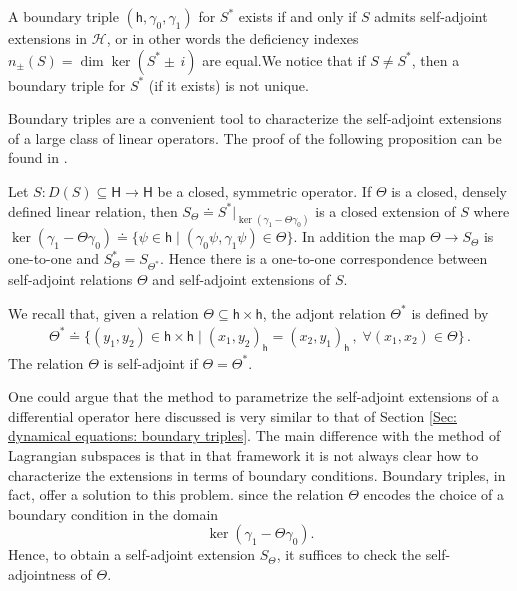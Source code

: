 \begin{remark}\label{Rmk: boundary triple}
	A boundary triple $(\mathsf{h},\gamma_0,\gamma_1)$ for $S^*$ exists if and only if $S$ admits self-adjoint extensions in $\mathcal{H}$, or in other words the deficiency indexes $n_\pm(S) = \dim \ker (S^* \pm\, i)$ are equal.We notice that if $S\neq S^*$, then a boundary triple for $S^*$ (if it exists) is not unique.
\end{remark}

Boundary triples are a convenient tool to characterize the self-adjoint extensions of a large class of linear operators. The proof of the following proposition can be found in \cite{Malamud}.

\begin{proposition}\label{Prop: Self-Adjoint Extensions}
	Let $S:D(S)\subseteq\mathsf{H}\to\mathsf{H}$ be a closed, symmetric operator.
	If $\Theta$ is a closed, densely defined linear relation, then $S_\Theta\doteq S^*|_{\ker(\gamma_1-\Theta\gamma_0)}$ is a closed extension of $S$
	where $\ker(\gamma_1-\Theta\gamma_0)\doteq\{\psi\in\mathsf{h}\;|\;(\gamma_0\psi,\gamma_1\psi)\in\Theta\}$.
	In addition the map $\Theta\to S_\Theta$ is one-to-one and $S^*_\Theta=S_{\Theta^*}$.
	Hence there is a one-to-one correspondence between self-adjoint relations $\Theta$ and self-adjoint extensions of $S$.
\end{proposition}

\begin{remark}\label{Rmk: relations}
	We recall that, given a relation $\Theta\subseteq\mathsf{h}\times\mathsf{h}$, the adjont relation $\Theta^*$ is defined by
	\begin{align}\label{Eqn: adjoint relation}
	\Theta^*\doteq\lbrace(y_1,y_2)\in\mathsf{h}\times\mathsf{h}\;|\;
	(x_1,y_2)_{\mathsf{h}}=(x_2,y_1)_{\mathsf{h}}\,,\;\forall(x_1,x_2)\in\Theta\rbrace\,.
	\end{align}
	The relation $\Theta$ is self-adjoint if $\Theta=\Theta^*$.
\end{remark}

One could argue that the method to parametrize the self-adjoint extensions of a differential operator here discussed is very similar to that of Section \ref{Sec: dynamical equations: boundary triples}. The main difference with the method of Lagrangian subspaces is that in that framework it is not always clear how to characterize the extensions in terms of boundary conditions. Boundary triples, in fact, offer a solution to this problem. since the relation $\Theta$ encodes the choice of a boundary condition in the domain
\begin{equation}\label{Eqn: ker boundary triples}
	\ker (\gamma_1-\Theta \gamma_0).
\end{equation}
Hence, to obtain a self-adjoint extension $S_\Theta$, it suffices to check the self-adjointness of $\Theta$.

